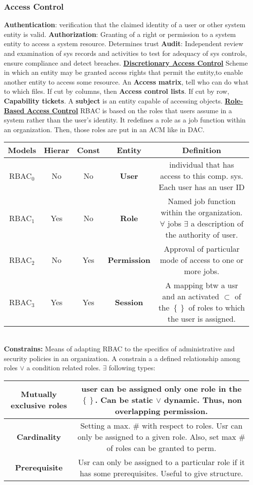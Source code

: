 \documentclass[a4paper,1pt]{article}
\begin{document}
\subsubsection{Access Control} %
\label{sub:Access Control}
  {\bf Authentication}: verification that the claimed identity of a user or other system entity is valid. 
  {\bf Authorization}: Granting of a right or permission to a system entity to access a system resource. Determines trust 
  {\bf Audit}: Independent review and examination of sys records and activities to test for adequacy of sys controls, ensure compliance and detect breaches. 
\underline{{\bf Discretionary Access Control}}
Scheme in which an entity may be granted access rights that permit the entity,to enable another entity to access some resource. An {\bf Access matrix}, tell who can do what to which files. If cut by columns, then {\bf Access control lists}. If cut by row, {\bf Capability tickets}. A {\bf subject} is an entity capable of accessing objects. 
\underline{{\bf Role-Based Access Control}} 
RBAC is based on the roles that users assume in a system rather than the user's identity. It redefines a role as a job function within an organization. Then, those roles are put in an ACM like in DAC. \\
\begin{tabular}{| c | c | c | c | c |}
  \hline
  {\bf Models} & {\bf Hierar} & {\bf Const} & {\bf Entity} & {\bf Definition} \\
  \hline
  RBAC$_0$ & No & No & {\bf User} & individual that has access to this comp. sys. Each user has an user ID \\
  \hline
  RBAC$_1$ & Yes & No & {\bf Role} & Named job function within the organization. $\forall$ jobs $\exists$ a description of the authority of user.\\
  \hline
  RBAC$_2$ & No & Yes & {\bf Permission} & Approval of particular mode of access to one or more jobs.  \\
  \hline
  RBAC$_3$ & Yes & Yes & {\bf Session} & A mapping btw a usr and an activated $\subset$ of the $\left\{  \right\}$ of roles to which the user is assigned.\\
  \hline
\end{tabular} \\
{\bf Constrains:} Means of adapting RBAC to the specifics of administrative and security policies in an organization. A constrain a a defined relationship among roles $\lor$ a condition related roles. $\exists$ following types: \\
\begin{tabular}{| c | c}
  \hline
  {\bf Mutually exclusive roles} & user can be assigned only one role in the $\left\{  \right\}$. Can be static $\lor$ dynamic. Thus, non overlapping permission. \\
  \hline
  {\bf Cardinality }  & Setting a max. $\#$ with respect to roles. Usr can only be assigned to a given role. Also, set max $\#$ of roles can be granted to perm. \\
  \hline
  {\bf Prerequisite} & Usr can only be assigned to a particular role if it has some prerequisites. Useful to give structure. \\
  \hline
\end{tabular}
\end{document}
